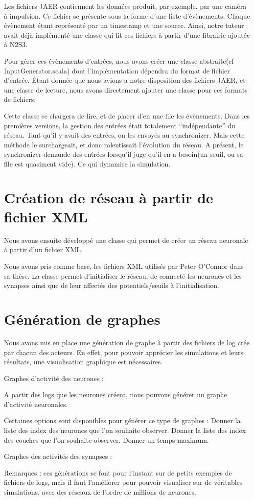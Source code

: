 \documentclass{article}
\begin{document}
    Les fichiers JAER contiennent les données produit, par exemple, par une caméra à impulsion. Ce fichier se présente sous la forme d’une liste d'évènements. Chaque évènement étant représenté par un timestamp et une source. Ainsi, notre tuteur avait déjà implémenté une classe qui lit ces fichiers à partir d’une librairie ajoutée à N2S3. 

    Pour gérer ces évènements d’entrées, nous avons créer une classe abstraite(cf InputGenerator.scala) dont l’implémentation dépendra du format de fichier d’entrée. Étant donnée que nous avions a notre disposition des fichiers JAER, et une classe de lecture, nous avons directement ajouter une classe pour ces formats de fichiers.

    Cette classe se chargera de lire, et de placer d’en une file les évènements. Dans les premières versions, la gestion des entrées était totalement “indépendante” du réseau. Tant qu’il y avait des entrées, on les envoyés au synchronizer. Mais cette méthode le surchargeait, et donc ralentissait l’évolution du réseau. A présent, le synchronizer demande des entrées lorsqu’il juge qu’il en a besoin(un seuil, ou sa file est quasiment vide). Ce qui dynamise la simulation.


\section{Création de réseau à partir de fichier XML}

Nous avons ensuite développé une classe qui permet de créer un réseau neuronale à partir d’un fichier XML.

Nous avons pris comme base, les fichiers XML utilisés par Peter O’Connor dans sa thèse. La classe permet d’initialiser le réseau, de connecté les neurones et les synapses ainsi que de leur affectés des potentiels/seuils à l’initialisation.

\section{Génération de graphes}

    Nous avons mis en place une génération de graphe à partir des fichiers de log crée par chacun des acteurs. En effet, pour pouvoir apprécier les simulations et leurs résultats, une visualisation graphique est nécessaires.

    Graphes d’activité des neurones : 

A partir des logs que les neurones créent, nous pouvons générer un graphe d’activité neuronales. 



Certaines options sont disponibles pour générer ce type de graphes :
Donner la liste des index des neurones que l’on souhaite observer.
Donner la liste des index des couches que l’on souhaite observer.
Donner un temps maximum.


    Graphes des activités des synapses : 


Remarques : ces générations se font pour l’instant sur de petits exemples de fichiers de logs, mais il faut l’améliorer pour pouvoir visualiser sur de véritables simulations, avec des réseaux de l’ordre de millions de neurones.
\end{document}
